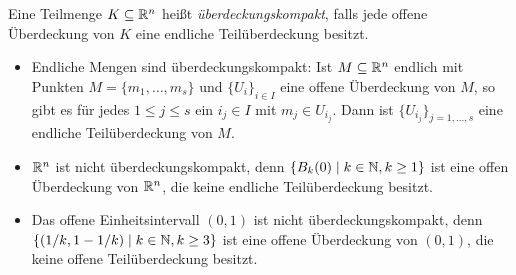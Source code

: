 \documentclass[a4paper,10pt]{article}
\begin{document}
\begin{defi}
 Eine Teilmenge $K \subseteq \mathbb{R}^n$ heißt \emph{überdeckungskompakt}, falls jede offene Überdeckung von $K$ eine endliche Teilüberdeckung besitzt.
\end{defi}


\begin{bsp}
 \begin{itemize}
  \item
   Endliche Mengen sind überdeckungskompakt: Ist $M \subseteq \mathbb{R}^n$ endlich mit Punkten $M = \{m_1, \dotsc, m_s\}$ und $\{U_i\}_{i \in I}$ eine offene Überdeckung von $M$, so gibt es für jedes $1 \leq j \leq s$ ein $i_j \in I$ mit $m_j \in U_{i_j}$. Dann ist $\{U_{i_j}\}_{j=1,\dotsc,s}$ eine endliche Teilüberdeckung von $M$.
  \item
   $\mathbb{R}^n$ ist nicht überdeckungskompakt, denn $\{B_k(0) \mid k \in \mathbb{N}, k \geq 1\}$ ist eine offen Überdeckung von $\mathbb{R}^n$, die keine endliche Teilüberdeckung besitzt.
  \item
   Das offene Einheitsintervall $(0,1)$ ist nicht überdeckungskompakt, denn $\{(1/k, 1-1/k) \mid k \in \mathbb{N}, k \geq 3\}$ ist eine offene Überdeckung von $(0,1)$, die keine offene Teilüberdeckung besitzt.
 \end{itemize}
\end{bsp}
\end{document}

